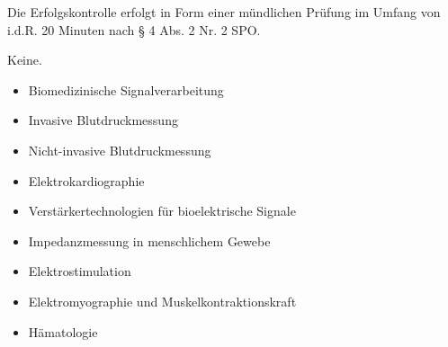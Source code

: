 \begin{course}

\setdoclanguagegerman
{}



\coursehead


\label{cour_8147.dp_997}


\begin{styleenv}
\begin{assessment}
Die Erfolgskontrolle erfolgt in Form einer mündlichen Prüfung im Umfang von i.d.R. 20 Minuten nach § 4 Abs. 2 Nr. 2 SPO.


\end{assessment}

\begin{conditions}Keine.\end{conditions}


\end{styleenv}

\begin{learningoutcomes}

\end{learningoutcomes}

\begin{content}
\begin{itemize}\item  Biomedizinische Signalverarbeitung  \item  Invasive Blutdruckmessung  \item  Nicht-invasive Blutdruckmessung  \item  Elektrokardiographie  \item  Verstärkertechnologien für bioelektrische Signale  \item  Impedanzmessung in menschlichem Gewebe  \item  Elektrostimulation  \item  Elektromyographie und Muskelkontraktionskraft  \item  Hämatologie  \end{itemize}
\end{content}







\end{course}